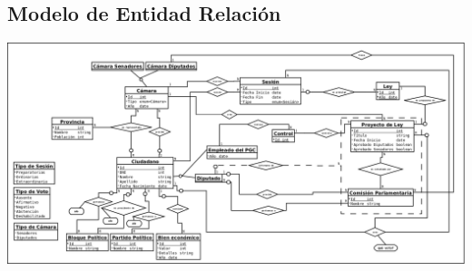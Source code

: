 \begin{landscape}

\section{Modelo de Entidad Relación}

\includegraphics[width=1.6\textwidth]{CongresoDeAlgunaNacion.png}

\end{landscape}

